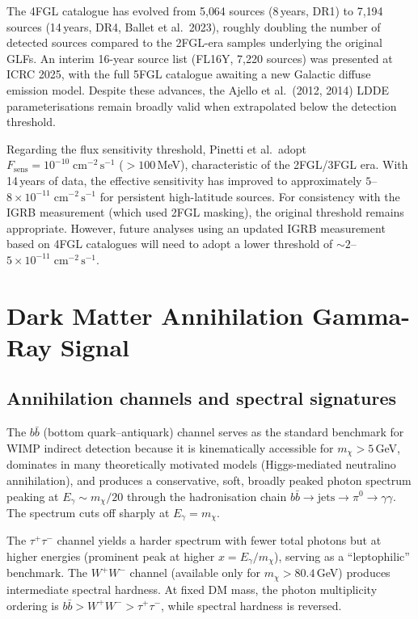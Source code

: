 \documentclass[10pt,a4paper]{article}
\newcommand{\mchi}{m_\chi}
\newcommand{\Fsens}{F_{\mathrm{sens}}}
\begin{document}
The 4FGL catalogue has evolved from 5{,}064 sources (8\,years, DR1) to 7{,}194 sources (14\,years, DR4, Ballet et al.\ 2023), roughly doubling the number of detected sources compared to the 2FGL-era samples underlying the original GLFs. An interim 16-year source list (FL16Y, 7{,}220 sources) was presented at ICRC 2025, with the full 5FGL catalogue awaiting a new Galactic diffuse emission model. Despite these advances, the Ajello et al.\ (2012, 2014) LDDE parameterisations remain broadly valid when extrapolated below the detection threshold.

Regarding the flux sensitivity threshold, Pinetti et al.\ adopt $\Fsens = 10^{-10}\;\mathrm{cm^{-2}\,s^{-1}}$ ($>100$\,MeV), characteristic of the 2FGL/3FGL era. With 14\,years of data, the effective sensitivity has improved to approximately $5$--$8\times 10^{-11}\;\mathrm{cm^{-2}\,s^{-1}}$ for persistent high-latitude sources. For consistency with the \citet{Ackermann2015} IGRB measurement (which used 2FGL masking), the original threshold remains appropriate. However, future analyses using an updated IGRB measurement based on 4FGL catalogues will need to adopt a lower threshold of $\sim2$--$5\times 10^{-11}\;\mathrm{cm^{-2}\,s^{-1}}$.


\section{Dark Matter Annihilation Gamma-Ray Signal}
\label{sec:dm_signal}

\subsection{Annihilation channels and spectral signatures}

The $b\bar{b}$ (bottom quark--antiquark) channel serves as the standard benchmark for WIMP indirect detection because it is kinematically accessible for $\mchi > 5$\,GeV, dominates in many theoretically motivated models (Higgs-mediated neutralino annihilation), and produces a conservative, soft, broadly peaked photon spectrum peaking at $E_\gamma \sim \mchi / 20$ through the hadronisation chain $b\bar{b} \to \mathrm{jets} \to \pi^0 \to \gamma\gamma$. The spectrum cuts off sharply at $E_\gamma = \mchi$.

The $\tau^+\tau^-$ channel yields a harder spectrum with fewer total photons but at higher energies (prominent peak at higher $x = E_\gamma/\mchi$), serving as a ``leptophilic'' benchmark. The $W^+W^-$ channel (available only for $\mchi > 80.4$\,GeV) produces intermediate spectral hardness. At fixed DM mass, the photon multiplicity ordering is $b\bar{b} > W^+W^- > \tau^+\tau^-$, while spectral hardness is reversed.
\end{document}

